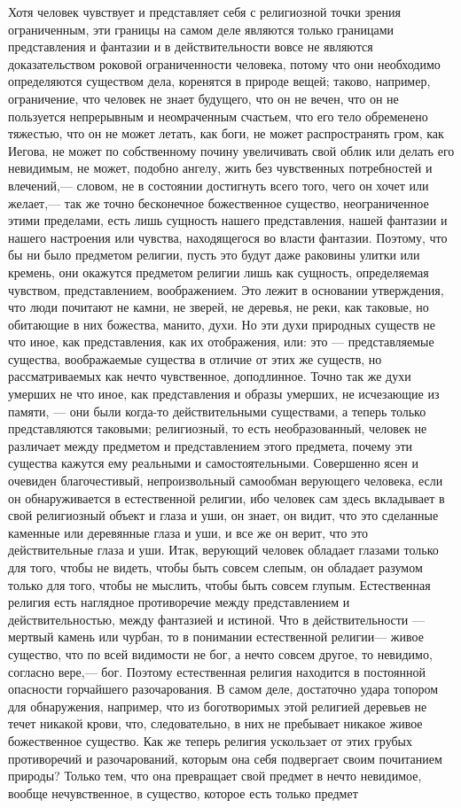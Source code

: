 \documentclass[12pt]{article}
\begin{document}
Хотя человек чувствует и представляет себя с религиозной точки зрения ограниченным, эти границы на самом деле являются только границами представления и фантазии и в действительности вовсе не являются доказательством роковой ограниченности человека, потому что они необходимо определяются существом дела, коренятся в природе вещей; таково, например, ограничение, что человек не знает будущего, что он не вечен, что он не пользуется непрерывным и неомраченным счастьем, что его тело обременено тяжестью, что он не может летать, как боги, не может распространять гром, как Иегова, не может по собственному почину увеличивать свой облик или делать его невидимым, не может, подобно ангелу, жить без чувственных потребностей и влечений,--- словом, не в состоянии достигнуть всего того, чего он хочет или желает,--- так же точно бесконечное божественное существо, неограниченное этими пределами, есть лишь сущность нашего представления, нашей фантазии и нашего настроения или чувства, находящегося во власти фантазии. Поэтому, что бы ни было предметом религии, пусть это будут даже раковины улитки или кремень, они окажутся предметом религии лишь как сущность, определяемая чувством, представлением, воображением. Это лежит в основании утверждения, что люди почитают не камни, не зверей, не деревья, не реки, как таковые, но обитающие в них божества, манито, духи. Но эти духи природных существ не что иное, как представления, как их отображения, или: это --- представляемые существа, воображаемые существа в отличие от этих же существ, но рассматриваемых как нечто чувственное, доподлинное. Точно так же духи умерших не что иное, как представления и образы умерших, не исчезающие из памяти, --- они были когда-то действительными существами, а теперь только представляются таковыми; религиозный, то есть необразованный, человек не различает между предметом и представлением этого предмета, почему эти существа кажутся ему реальными и самостоятельными. Совершенно ясен и очевиден благочестивый, непроизвольный самообман верующего человека, если он обнаруживается в естественной религии, ибо человек сам здесь вкладывает в свой религиозный объект и глаза и уши, он знает, он видит, что это сделанные каменные или деревянные глаза и уши, и все же он верит, что это действительные глаза и уши. Итак, верующий человек обладает глазами только для того, чтобы не видеть, чтобы быть совсем слепым, он обладает разумом только для того, чтобы не мыслить, чтобы быть совсем глупым. Естественная религия есть наглядное противоречие между представлением и действительностью, между фантазией и истиной. Что в действительности --- мертвый камень или чурбан, то в понимании естественной религии--- живое существо, что по всей видимости не бог, а нечто совсем другое, то невидимо, согласно вере,--- бог. Поэтому естественная религия находится в постоянной опасности горчайшего разочарования. В самом деле, достаточно удара топором для обнаружения, например, что из боготворимых этой религией деревьев не течет никакой крови, что, следовательно, в них не пребывает никакое живое божественное существо. Как же теперь религия ускользает от этих грубых противоречий и разочарований, которым она себя подвергает своим почитанием природы? Только тем, что она превращает свой предмет в нечто невидимое, вообще нечувственное, в существо, которое есть только предмет 
\end{document}
